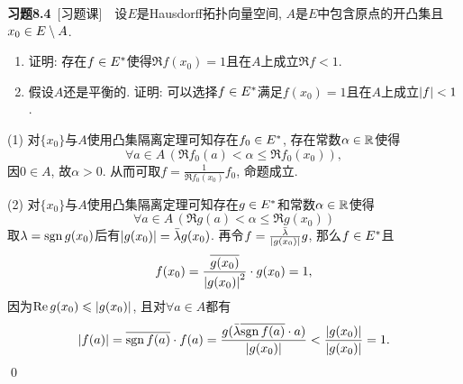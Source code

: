     \textbf{习题8.4}\ [习题课]\ \ 设$ E $是Hausdorff拓扑向量空间, $ A $是$ E $中包含原点的开凸集且$ x_0\in E\setminus A $.
    \begin{enumerate}[(1)]
    \item 证明: 存在$ f\in E^{*} $使得$ \Re f(x_0)=1 $且在$ A $上成立$ \Re f<1 $.
    \item 假设$ A $还是平衡的. 证明: 可以选择$ f\in E^{*} $满足$ f(x_0)=1 $且在$ A $上成立$ \left| f \right| <1 $.
    \end{enumerate}
    \begin{Proof}
    (1) 对$ \{x_0\} $与$ A $使用凸集隔离定理可知存在$ f_0\in E^{*} $, 存在常数$ \alpha\in\mathbb{R} $使得
    \[
    \forall a\in A\,(\Re f_0(a)<\alpha\leqslant\Re f_0(x_0)),
    \]
    因$ 0\in A $, 故$ \alpha>0 $. 从而可取$ f=\frac{1}{\Re f_0(x_0)}f_0 $, 命题成立.

    (2) 对$ \{ x_0 \} $与$ A $使用凸集隔离定理可知存在$ g\in E^{*} $和常数$ \alpha\in\mathbb{R} $使得
    \[
    \forall a\in A\,(\Re g(a)<\alpha\leqslant\Re g(x_0))
    \]
    取$ \lambda=\mathrm{sgn}\, g(x_0) $后有$ \left| g(x_0) \right| =\bar{\lambda}g(x_0) $. 再令$ f=\frac{\bar{\lambda}}{\left| g(x_0) \right| }g $, 那么$ f\in E^{*} $且
    \[
    f(x_0)=\frac{\overline{g(x_0)}}{\left| g(x_0) \right| ^2}\cdot g(x_0)=1,
    \]
    因为$ \mathrm{Re\,} g(x_0)\leqslant\left| g(x_0) \right|  $, 且对$ \forall a\in A $都有
    \[
    \left| f(a) \right| =\overline{\mathrm{sgn}\, f(a)}\cdot f(a)=\frac{g(\bar{\lambda}\overline{\mathrm{sgn}\, f(a)}\cdot a)}{\left| g(x_0) \right| }<\frac{\left| g(x_0) \right| }{\left| g(x_0) \right| }=1.
    \]
    \qed
    \end{Proof}

